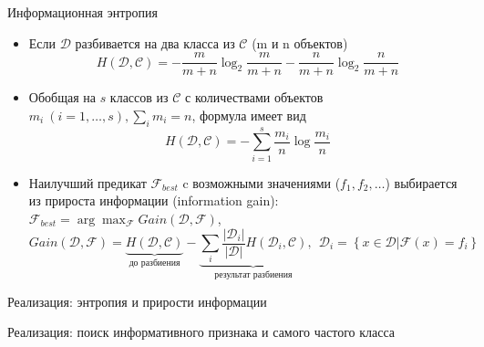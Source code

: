 \documentclass[compress,red,unicode]{beamer}
\begin{document}
\begin{frame}{Информационная энтропия}
\begin{itemize}
	\item Если $\mathcal{D}$ разбивается на два класса из $\mathcal{C}$ (m и n объектов) 
$$
H(\mathcal{D},\mathcal{C}) = - \frac{m}{m+n} \log_2 \frac{m}{m+n} - \frac{n}{m+n} \log_2 \frac{n}{m+n}
$$ 
	\item Обобщая на $s$ классов из $\mathcal{C}$ с количествами объектов $m_i~(i=1,\dots,s), \sum_i m_i = n$, формула имеет вид
$$
H(\mathcal{D},\mathcal{C}) = - \sum_{i=1}^{s} \frac{m_i}{n} \log \frac{m_i}{n}
$$
	\item Наилучший предикат $\mathcal{F}_{best}$ c возможными значениями ($f_1, f_2, \dots$) выбирается из прироста информации (information gain): $ \mathcal{F}_{best} =\arg \displaystyle\max_\mathcal{F} Gain(\mathcal{D},\mathcal{F}) $,
$$
Gain(\mathcal{D},\mathcal{F}) = \underbrace{H(\mathcal{D},\mathcal{C})}_\text{до разбиения} - \underbrace{\sum_i \frac{|\mathcal{D}_i|}{|\mathcal{D}|} H(\mathcal{D}_i,\mathcal{C})}_\text{результат разбиения}, ~~\mathcal{D}_i = \left\{x \in \mathcal{D} | \mathcal{F}(x) = f_i \right\}
$$
\end{itemize}
\end{frame}

\begin{frame}{Реализация: энтропия и прирости информации}
\begin{block}{}
\scriptsize

\end{block}
\end{frame}


\begin{frame}{Реализация: поиск информативного признака и самого частого класса}
\begin{block}{}
\scriptsize

\end{block}
\end{frame}
\end{document}
